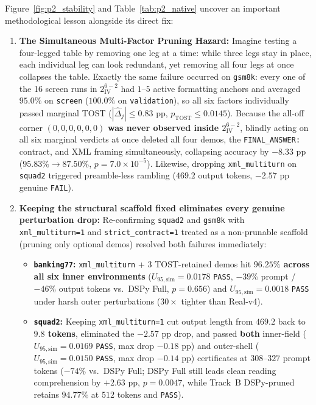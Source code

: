 \documentclass[11pt,a4paper]{article}
\begin{document}
Figure~\ref{fig:p2_stability} and Table~\ref{tab:p2_native} uncover an important methodological lesson alongside its direct fix:
\begin{enumerate}[leftmargin=*,nosep]
    \item \textbf{The Simultaneous Multi-Factor Pruning Hazard:} Imagine testing a four-legged table by removing one leg at a time: while three legs stay in place, each individual leg can look redundant, yet removing all four legs at once collapses the table. Exactly the same failure occurred on \texttt{gsm8k}: every one of the 16 screen runs in $2^{6-2}_{\mathrm{IV}}$ had $1$--$5$ active formatting anchors and averaged $95.0\%$ on \texttt{screen} ($100.0\%$ on \texttt{validation}), so all six factors individually passed marginal TOST ($|\hat{\Delta}_j| \le 0.83\text{ pp}$, $p_{\mathrm{TOST}} \le 0.0145$). Because the all-off corner $(0,0,0,0,0,0)$ \textbf{was never observed inside $2^{6-2}_{\mathrm{IV}}$}, blindly acting on all six marginal verdicts at once deleted all four demos, the \texttt{FINAL\_ANSWER:} contract, and XML framing simultaneously, collapsing accuracy by \textbf{$-8.33\text{ pp}$} ($95.83\% \to 87.50\%$, $p = 7.0\times 10^{-5}$). Likewise, dropping \texttt{xml\_multiturn} on \texttt{squad2} triggered preamble-less rambling ($469.2$ output tokens, $-2.57\text{ pp}$ genuine \texttt{FAIL}).
    \item \textbf{Keeping the structural scaffold fixed eliminates every genuine perturbation drop:} Re-confirming \texttt{squad2} and \texttt{gsm8k} with \texttt{xml\_multiturn=1} and \texttt{strict\_contract=1} treated as a non-prunable scaffold (pruning only optional demos) resolved both failures immediately:
    \begin{itemize}[leftmargin=*,nosep]
        \item \textbf{\texttt{banking77}:} \texttt{xml\_multiturn} + 3 TOST-retained demos hit \textbf{$96.25\%$ across all six inner environments} ($U_{95,\mathrm{sim}}=0.0178$ \texttt{PASS}, $-39\%$ prompt / $-46\%$ output tokens vs.\ DSPy Full, $p=0.656$) and $U_{95,\mathrm{sim}}=0.0018$ \texttt{PASS} under harsh outer perturbations ($30\times$ tighter than Real-v4).
        \item \textbf{\texttt{squad2}:} Keeping \texttt{xml\_multiturn=1} cut output length from $469.2$ back to \textbf{$9.8$ tokens}, eliminated the $-2.57\text{ pp}$ drop, and passed \textbf{both} inner-field ($U_{95,\mathrm{sim}}=0.0169$ \texttt{PASS}, max drop $-0.18\text{ pp}$) and outer-shell ($U_{95,\mathrm{sim}}=0.0150$ \texttt{PASS}, max drop $-0.14\text{ pp}$) certificates at $308$--$327$ prompt tokens ($-74\%$ vs.\ DSPy Full; DSPy Full still leads clean reading comprehension by $+2.63\text{ pp}$, $p=0.0047$, while Track~B DSPy-pruned retains $94.77\%$ at $512$ tokens and \texttt{PASS}).

\end{itemize}
\end{enumerate}
\end{document}
